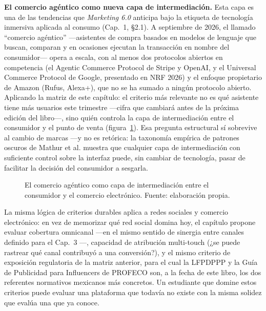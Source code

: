 \begin{cajaFrontera}
\textbf{El comercio agéntico como nueva capa de intermediación.} Esta capa
es una de las tendencias que \textit{Marketing 6.0} anticipa bajo la
etiqueta de tecnología inmersiva aplicada al consumo
\parencite{kotler2024marketing6} (Cap.~1, §2.1). A
septiembre de 2026, el llamado \enquote{comercio agéntico} —asistentes de
compra basados en modelos de lenguaje que buscan, comparan y en ocasiones
ejecutan la transacción en nombre del consumidor— opera a escala, con al
menos dos protocolos abiertos en competencia (el Agentic Commerce Protocol
de Stripe y OpenAI, y el Universal Commerce Protocol de Google, presentado
en NRF 2026) y el enfoque propietario de Amazon (Rufus, Alexa+), que no se
ha sumado a ningún protocolo abierto. Aplicando la matriz de este capítulo:
el criterio más relevante no es qué asistente tiene más usuarios este
trimestre —cifra que cambiará antes de la próxima edición del libro—, sino
quién controla la capa de intermediación entre el consumidor y el punto de
venta (figura~\ref{fig:cap04-agentico}). Esa pregunta estructural sí
sobrevive al cambio de marcas —y no es retórica: la taxonomía empírica de
patrones oscuros de Mathur et al. \parencite{mathur2019} muestra que
cualquier capa de intermediación con suficiente control sobre la interfaz
puede, sin cambiar de tecnología, pasar de facilitar la decisión del
consumidor a sesgarla.
\end{cajaFrontera}

\begin{figure}[htbp]
  \centering
  
  \caption{El comercio agéntico como capa de intermediación entre el
  consumidor y el comercio electrónico. Fuente: elaboración propia.}
  \label{fig:cap04-agentico}
\end{figure}

La misma lógica de criterios durables aplica a redes sociales y comercio
electrónico: en vez de memorizar qué red social domina hoy, el capítulo
propone evaluar cobertura omnicanal —en el mismo sentido de sinergia entre
canales definido para el Cap.~3 \parencite{verhoef2015}—, capacidad de
atribución multi-touch (¿se puede rastrear qué canal contribuyó a una
conversión?), y el mismo criterio de exposición regulatoria de la matriz
anterior, para el cual la LFPDPPP \parencite{dof_lfpdppp2025} y la Guía de
Publicidad para Influencers de PROFECO \parencite{profeco2023influencers}
son, a la fecha de este libro, los dos referentes normativos mexicanos más
concretos. Un estudiante que domine estos criterios puede evaluar una
plataforma que todavía no existe con la misma solidez que evalúa una que ya
conoce.


